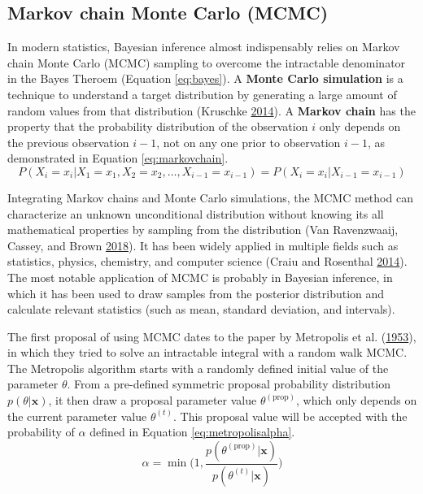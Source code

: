 \documentclass[12pt]{book}
\numberwithin{equation}{chapter}
\begin{document}
\hypertarget{markov-chain-monte-carlo-mcmc}{%
\subsection{Markov chain Monte Carlo (MCMC)}\label{markov-chain-monte-carlo-mcmc}}

In modern statistics, Bayesian inference almost indispensably relies on Markov chain Monte Carlo (MCMC) sampling to overcome the intractable denominator in the Bayes Theroem (Equation \eqref{eq:bayes}). A \textbf{Monte Carlo simulation} is a technique to understand a target distribution by generating a large amount of random values from that distribution (Kruschke \protect\hyperlink{ref-kruschke2014doing}{2014}). A \textbf{Markov chain} has the property that the probability distribution of the observation \(i\) only depends on the previous observation \(i-1\), not on any one prior to observation \(i-1\), as demonstrated in Equation \eqref{eq:markovchain}.
\begin{equation}
P\left(X_{i}=x_{i} | X_{1}=x_{1}, X_{2}=x_{2}, \ldots, X_{i-1}=x_{i-1}\right) = P\left(X_{i}=x_{i} | X_{i-1}=x_{i-1}\right)
\label{eq:markovchain}
\end{equation}

Integrating Markov chains and Monte Carlo simulations, the MCMC method can characterize an unknown unconditional distribution without knowing its all mathematical properties by sampling from the distribution (Van Ravenzwaaij, Cassey, and Brown \protect\hyperlink{ref-van2018simple}{2018}). It has been widely applied in multiple fields such as statistics, physics, chemistry, and computer science (Craiu and Rosenthal \protect\hyperlink{ref-craiu2014bayesian}{2014}). The most notable application of MCMC is probably in Bayesian inference, in which it has been used to draw samples from the posterior distribution and calculate relevant statistics (such as mean, standard deviation, and intervals).

The first proposal of using MCMC dates to the paper by Metropolis et al. (\protect\hyperlink{ref-metropolis1953equation}{1953}), in which they tried to solve an intractable integral with a random walk MCMC. The Metropolis algorithm starts with a randomly defined initial value of the parameter \(\theta\). From a pre-defined symmetric proposal probability distribution \(p(\theta | \mathbf{x})\), it then draw a proposal parameter value \(\theta^{(\text{prop})}\), which only depends on the current parameter value \(\theta^{(t)}\). This proposal value will be accepted with the probability of \(\alpha\) defined in Equation \eqref{eq:metropolisalpha}.
\begin{equation}
\alpha = \min\bigg(1, \frac{p(\theta^{(\text{prop})}|\mathbf{x})}{p(\theta^{(t)}|\mathbf{x})}\bigg)
\label{eq:metropolisalpha}
\end{equation}
\end{document}
